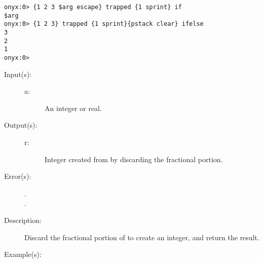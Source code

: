 \begin{description}
\begin{description}
\begin{verbatim}
onyx:0> {1 2 3 $arg escape} trapped {1 sprint} if
$arg
onyx:0> {1 2 3} trapped {1 sprint}{pstack clear} ifelse
3
2
1
onyx:0>
		\end{verbatim}
	\end{description}
\label{systemdict:trunc}
\item[{\onyxop{a}{trunc}{r}}: ]
	\begin{description}\item[]
	\item[Input(s): ]
		\begin{description}\item[]
		\item[a: ]
			An integer or real.
		\end{description}
	\item[Output(s): ]
		\begin{description}\item[]
		\item[r: ]
			Integer created from  by discarding the
			fractional portion.
		\end{description}
	\item[Error(s): ]
		\begin{description}\item[]
		\item[.]
		\item[.]
		\end{description}
	\item[Description: ]
		Discard the fractional portion of  to create an
		integer, and return the result.
	\item[Example(s): ]\begin{verbatim}


\end{verbatim}
\end{description}
\end{description}
